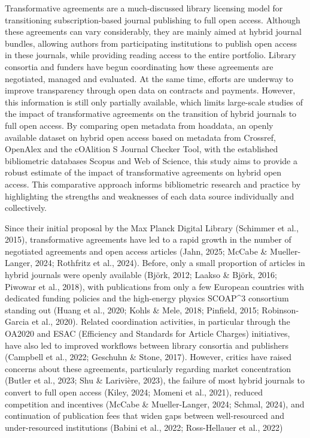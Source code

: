 \documentclass[a4paper,man,floatsintext,longtable,noextraspace,10pt]{apa6}
\begin{document}
Transformative agreements are a much-discussed library licensing model
for transitioning subscription-based journal publishing to full open
access. Although these agreements can vary considerably, they are mainly
aimed at hybrid journal bundles, allowing authors from participating
institutions to publish open access in these journals, while providing
reading access to the entire portfolio. Library consortia and funders
have begun coordinating how these agreements are negotiated, managed and
evaluated. At the same time, efforts are underway to improve
transparency through open data on contracts and payments. However, this
information is still only partially available, which limits large-scale
studies of the impact of transformative agreements on the transition of
hybrid journals to full open access. By comparing open metadata from
hoaddata, an openly available dataset on hybrid open access based on
metadata from Crossref, OpenAlex and the cOAlition S Journal Checker
Tool, with the established bibliometric databases Scopus and Web of
Science, this study aims to provide a robust estimate of the impact of
transformative agreements on hybrid open access. This comparative
approach informs bibliometric research and practice by highlighting the
strengths and weaknesses of each data source individually and
collectively.

Since their initial proposal by the Max Planck Digital Library (Schimmer
et al., 2015), transformative agreements have led to a rapid growth in
the number of negotiated agreements and open access articles (Jahn,
2025; McCabe \& Mueller-Langer, 2024; Rothfritz et al., 2024). Before,
only a small proportion of articles in hybrid journals were openly
available (Björk, 2012; Laakso \& Björk, 2016; Piwowar et al., 2018),
with publications from only a few European countries with dedicated
funding policies and the high-energy physics SCOAP\^{}3 consortium
standing out (Huang et al., 2020; Kohls \& Mele, 2018; Pinfield, 2015;
Robinson-Garcia et al., 2020). Related coordination activities, in
particular through the OA2020 and ESAC (Efficiency and Standards for
Article Charges) initiatives, have also led to improved workflows
between library consortia and publishers (Campbell et al., 2022;
Geschuhn \& Stone, 2017). However, critics have raised concerns about
these agreements, particularly regarding market concentration (Butler et
al., 2023; Shu \& Larivière, 2023), the failure of most hybrid journals
to convert to full open access (Kiley, 2024; Momeni et al., 2021),
reduced competition and incentives (McCabe \& Mueller-Langer, 2024;
Schmal, 2024), and continuation of publication fees that widen gaps
between well-resourced and under-resourced institutions (Babini et al.,
2022; Ross-Hellauer et al., 2022)
\end{document}
